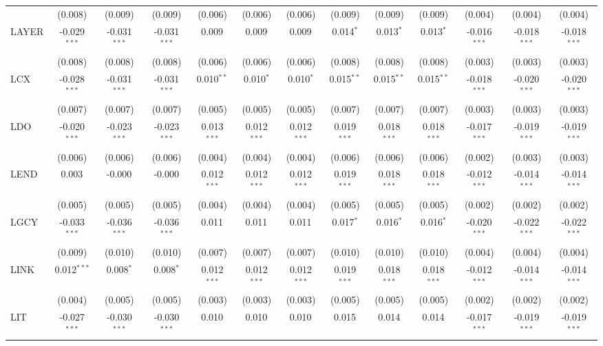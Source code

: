 \begin{table}[!htbp]
\begin{tabular}{@{\extracolsep{5pt}}lcccccccccccc}
  & (0.008) & (0.009) & (0.009) & (0.006) & (0.006) & (0.006) & (0.009) & (0.009) & (0.009) & (0.004) & (0.004) & (0.004) \\
 LAYER & -0.029$^{***}$ & -0.031$^{***}$ & -0.031$^{***}$ & 0.009$^{}$ & 0.009$^{}$ & 0.009$^{}$ & 0.014$^{*}$ & 0.013$^{*}$ & 0.013$^{*}$ & -0.016$^{***}$ & -0.018$^{***}$ & -0.018$^{***}$ \\
  & (0.008) & (0.008) & (0.008) & (0.006) & (0.006) & (0.006) & (0.008) & (0.008) & (0.008) & (0.003) & (0.003) & (0.003) \\
 LCX & -0.028$^{***}$ & -0.031$^{***}$ & -0.031$^{***}$ & 0.010$^{**}$ & 0.010$^{*}$ & 0.010$^{*}$ & 0.015$^{**}$ & 0.015$^{**}$ & 0.015$^{**}$ & -0.018$^{***}$ & -0.020$^{***}$ & -0.020$^{***}$ \\
  & (0.007) & (0.007) & (0.007) & (0.005) & (0.005) & (0.005) & (0.007) & (0.007) & (0.007) & (0.003) & (0.003) & (0.003) \\
 LDO & -0.020$^{***}$ & -0.023$^{***}$ & -0.023$^{***}$ & 0.013$^{***}$ & 0.012$^{***}$ & 0.012$^{***}$ & 0.019$^{***}$ & 0.018$^{***}$ & 0.018$^{***}$ & -0.017$^{***}$ & -0.019$^{***}$ & -0.019$^{***}$ \\
  & (0.006) & (0.006) & (0.006) & (0.004) & (0.004) & (0.004) & (0.006) & (0.006) & (0.006) & (0.002) & (0.003) & (0.003) \\
 LEND & 0.003$^{}$ & -0.000$^{}$ & -0.000$^{}$ & 0.012$^{***}$ & 0.012$^{***}$ & 0.012$^{***}$ & 0.019$^{***}$ & 0.018$^{***}$ & 0.018$^{***}$ & -0.012$^{***}$ & -0.014$^{***}$ & -0.014$^{***}$ \\
  & (0.005) & (0.005) & (0.005) & (0.004) & (0.004) & (0.004) & (0.005) & (0.005) & (0.005) & (0.002) & (0.002) & (0.002) \\
 LGCY & -0.033$^{***}$ & -0.036$^{***}$ & -0.036$^{***}$ & 0.011$^{}$ & 0.011$^{}$ & 0.011$^{}$ & 0.017$^{*}$ & 0.016$^{*}$ & 0.016$^{*}$ & -0.020$^{***}$ & -0.022$^{***}$ & -0.022$^{***}$ \\
  & (0.009) & (0.010) & (0.010) & (0.007) & (0.007) & (0.007) & (0.010) & (0.010) & (0.010) & (0.004) & (0.004) & (0.004) \\
 LINK & 0.012$^{***}$ & 0.008$^{*}$ & 0.008$^{*}$ & 0.012$^{***}$ & 0.012$^{***}$ & 0.012$^{***}$ & 0.019$^{***}$ & 0.018$^{***}$ & 0.018$^{***}$ & -0.012$^{***}$ & -0.014$^{***}$ & -0.014$^{***}$ \\
  & (0.004) & (0.005) & (0.005) & (0.003) & (0.003) & (0.003) & (0.005) & (0.005) & (0.005) & (0.002) & (0.002) & (0.002) \\
 LIT & -0.027$^{***}$ & -0.030$^{***}$ & -0.030$^{***}$ & 0.010$^{}$ & 0.010$^{}$ & 0.010$^{}$ & 0.015$^{}$ & 0.014$^{}$ & 0.014$^{}$ & -0.017$^{***}$ & -0.019$^{***}$ & -0.019$^{***}$ \\

\end{tabular}
\end{table}
